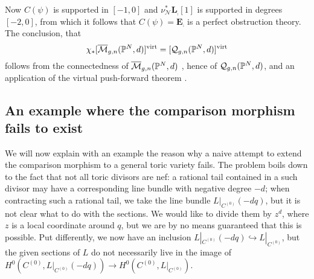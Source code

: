 \begin{center}
\end{center}
Now $C(\psi)$ is supported in $[-1,0]$ \cite[Lemma 4.20]{Manolache-Push} and $\nu_{\mathcal{N}}^*\mathbf L_{\tilde{\comp}}{[1]}$ is supported in degrees $[-2,0]$, from which it follows that $C(\psi)=\mathbf E_{\comp}$ is a perfect obstruction theory. The conclusion, that
\begin{equation*} \chi_*[\overline{\mathcal{M}}_{g,n}(\mathbb P^N,d)]^{\operatorname{virt}}=[\mathcal{Q}_{g,n}(\mathbb P^N,d)]^{\operatorname{virt}} \end{equation*}
follows from the connectedness of $\overline{\mathcal{M}}_{g,n}(\mathbb P^N,d)$ \cite{KP}, hence of $\mathcal{Q}_{g,n}(\mathbb P^N,d)$, and an application of the virtual push-forward theorem \cite[Proposition 4.21]{Manolache-Push}.

\subsection{An example where the comparison morphism fails to exist}
We will now explain with an example the reason why a naive attempt to extend the comparison morphism to a general toric variety fails. The problem boils down to the fact that not all toric divisors are nef: a rational tail contained in a such divisor may have a corresponding line bundle with negative degree $-d$; when contracting such a rational tail, we take the line bundle $L|_{C^{(0)}}(-dq)$, but it is not clear what to do with the sections. We would like to divide them by $z^d$, where $z$ is a local coordinate around $q$, but we are by no means guaranteed that this is possible. Put differently, we now have an inclusion $L|_{C^{(0)}}(-dq)\hookrightarrow L|_{C^{(0)}}$, but the given sections of $L$ do not necessarily live in the image of $H^0(C^{(0)},L|_{C^{(0)}}(-dq))\to H^0(C^{(0)},L|_{C^{(0)}})$.

